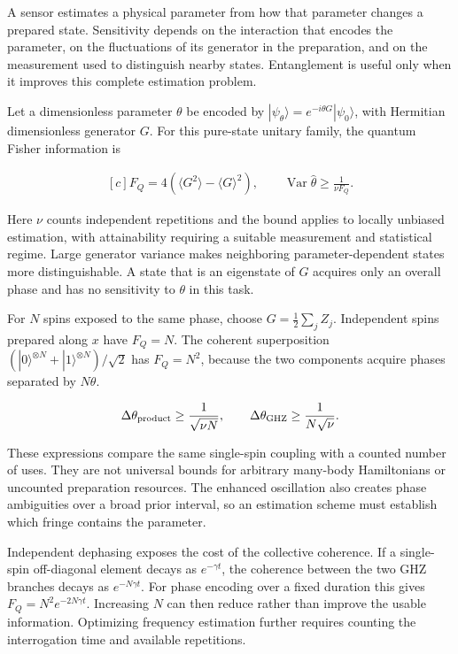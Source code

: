 \documentclass[11pt,oneside]{book}
\newenvironment{centeredalign}{\[\begin{gathered}[c]}{\end{gathered}\]}
\begin{document}
A sensor estimates a physical parameter from how that parameter changes a prepared state. Sensitivity depends on the interaction that encodes the parameter, on the fluctuations of its generator in the preparation, and on the measurement used to distinguish nearby states. Entanglement is useful only when it improves this complete estimation problem.

Let a dimensionless parameter \(\theta\) be encoded by \(|\psi_\theta\rangle=e^{-i\theta G}|\psi_0\rangle\), with Hermitian dimensionless generator \(G\). For this pure-state unitary family, the quantum Fisher information is

\begin{centeredalign}
F_Q=4(\langle G^2\rangle-\langle G\rangle^2),\qquad
\operatorname{Var}\widehat\theta\geq\frac{1}{\nu F_Q}.
\end{centeredalign}

Here \(\nu\) counts independent repetitions and the bound applies to locally unbiased estimation, with attainability requiring a suitable measurement and statistical regime. Large generator variance makes neighboring parameter-dependent states more distinguishable. A state that is an eigenstate of \(G\) acquires only an overall phase and has no sensitivity to \(\theta\) in this task.

For \(N\) spins exposed to the same phase, choose \(G=\tfrac12\sum_j Z_j\). Independent spins prepared along \(x\) have \(F_Q=N\). The coherent superposition \((|0\rangle^{\otimes N}+|1\rangle^{\otimes N})/\sqrt2\) has \(F_Q=N^2\), because the two components acquire phases separated by \(N\theta\).

\begin{centeredalign}
\Delta\theta_{\rm product}\geq\frac{1}{\sqrt{\nu N}},\qquad
\Delta\theta_{\rm GHZ}\geq\frac{1}{N\sqrt\nu}.
\end{centeredalign}

These expressions compare the same single-spin coupling with a counted number of uses. They are not universal bounds for arbitrary many-body Hamiltonians or uncounted preparation resources. The enhanced oscillation also creates phase ambiguities over a broad prior interval, so an estimation scheme must establish which fringe contains the parameter.

Independent dephasing exposes the cost of the collective coherence. If a single-spin off-diagonal element decays as \(e^{-\gamma t}\), the coherence between the two GHZ branches decays as \(e^{-N\gamma t}\). For phase encoding over a fixed duration this gives \(F_Q=N^2e^{-2N\gamma t}\). Increasing \(N\) can then reduce rather than improve the usable information. Optimizing frequency estimation further requires counting the interrogation time and available repetitions.
\end{document}
